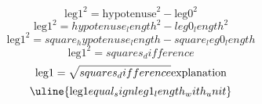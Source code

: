 \[\text{{{leg1}}}^{{2}}=\text{{{hypotenuse}}}^{{2}}-\text{{{leg0}}}^{{2}}\]
\[\text{{{leg1}}}^{{2}}={hypotenuse_length}^{{2}}-{leg0_length}^{{2}}\]
\[\text{{{leg1}}}^{{2}}={square_hypotenuse_length}-{square_leg0_length}\]
\[\text{{{leg1}}}^{{2}}={squares_difference}\]
\[\text{{{leg1}}}=\sqrt{{\mathstrut {squares_difference}}}\text{{{explanation}}}\]
\[\uline{{\text{{{leg1}}}{equal_sign}{leg1_length_with_unit}}}\]
